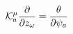 \documentclass[12pt]{article}
\begin{document}
\begin{displaymath}
{ \cal K } _ { a } ^ { \mu } { \frac { \partial } { \partial z _ { \omega } } } = { \frac { \theta } { \partial \psi _ { a } } }
\end{displaymath}
\end{document}
